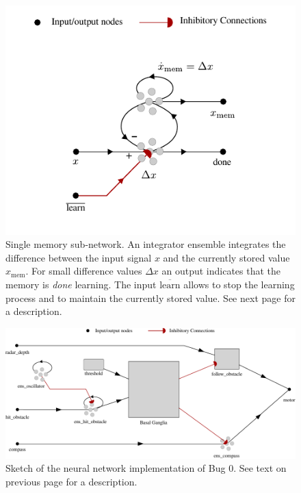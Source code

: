 \documentclass[letterpaper,10pt,conference]{ieeeconf}
\begin{document}
\begin{figure}
	\includegraphics{media/nengo_memory_network.pdf}
	\caption{Single memory sub-network. An integrator ensemble integrates the difference between the input signal $x$ and the currently stored value $x_\mathrm{mem}$. For small difference values $\Delta x$ an output indicates that the memory is \emph{done} learning. The input $\overline{\mathrm{learn}}$ allows to stop the learning process and to maintain the currently stored value. See next page for a description.}
	\label{fig:nengo_memory_network}
\end{figure}

\begin{figure}
	\centering
	\includegraphics{media/nengo_bug_0_network.pdf}
	\caption{Sketch of the neural network implementation of Bug 0. See text on previous page for a description.}
	\label{fig:nengo_bug_0_network}
\end{figure}
\end{document}
